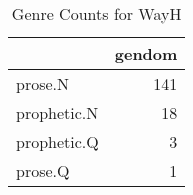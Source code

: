 \begin{table}[htbp!]
\centering
\caption{Genre Counts for WayH}
\label{table:WayH_genre_ct}
\begin{tabular}{lr}
\toprule
{} &  gendom \\
\midrule
prose.N     &     141 \\
prophetic.N &      18 \\
prophetic.Q &       3 \\
prose.Q     &       1 \\
\bottomrule
\end{tabular}
\end{table}
